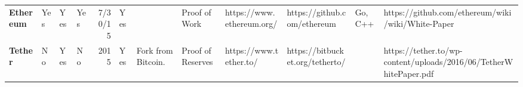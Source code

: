 \begin{table}[htbp]
\begin{adjustbox}{width=25cm, height=6cm, angle=270}
\begin{tabular}{llllrlp{17.915em}rlrrr}
      \rowcolor[rgb]{ .267,  .447,  .769} \textcolor[rgb]{ 1,  1,  1}{\textbf{Ethereum}} & \cellcolor[rgb]{ .776,  .937,  .808}\textcolor[rgb]{ 0,  .38,  0}{Yes} & \cellcolor[rgb]{ .776,  .937,  .808}\textcolor[rgb]{ 0,  .38,  0}{Yes} & \cellcolor[rgb]{ .776,  .937,  .808}\textcolor[rgb]{ 0,  .38,  0}{Yes} & \cellcolor[rgb]{ 1,  1,  1}\textcolor[rgb]{ .188,  .329,  .588}{7/30/15} & \cellcolor[rgb]{ .776,  .937,  .808}\textcolor[rgb]{ 0,  .38,  0}{Yes} & \multicolumn{1}{r}{\cellcolor[rgb]{ 1,  1,  1}\textcolor[rgb]{ .188,  .329,  .588}{}} & \multicolumn{1}{l}{\cellcolor[rgb]{ 1,  1,  1}\textcolor[rgb]{ .188,  .329,  .588}{Proof of Work}} & \cellcolor[rgb]{ 1,  1,  1}\textcolor[rgb]{ .188,  .329,  .588}{https://www.ethereum.org/} & \multicolumn{1}{l}{\cellcolor[rgb]{ 1,  1,  1}\textcolor[rgb]{ .188,  .329,  .588}{https://github.com/ethereum}} & \multicolumn{1}{l}{\cellcolor[rgb]{ 1,  1,  1}\textcolor[rgb]{ .188,  .329,  .588}{Go, C++}} & \multicolumn{1}{l}{\cellcolor[rgb]{ 1,  1,  1}\textcolor[rgb]{ .188,  .329,  .588}{https://github.com/ethereum/wiki/wiki/White-Paper}} \\
      \rowcolor[rgb]{ .267,  .447,  .769} \textcolor[rgb]{ 1,  1,  1}{\textbf{Tether}} & \cellcolor[rgb]{ 1,  .78,  .808}\textcolor[rgb]{ .612,  0,  .024}{No} & \cellcolor[rgb]{ .776,  .937,  .808}\textcolor[rgb]{ 0,  .38,  0}{Yes} & \cellcolor[rgb]{ 1,  .78,  .808}\textcolor[rgb]{ .612,  0,  .024}{No} & \cellcolor[rgb]{ .851,  .882,  .949}\textcolor[rgb]{ .188,  .329,  .588}{2015} & \cellcolor[rgb]{ .776,  .937,  .808}\textcolor[rgb]{ 0,  .38,  0}{Yes} & \cellcolor[rgb]{ .851,  .882,  .949}\textcolor[rgb]{ .188,  .329,  .588}{Fork from Bitcoin.} & \multicolumn{1}{l}{\cellcolor[rgb]{ .851,  .882,  .949}\textcolor[rgb]{ .188,  .329,  .588}{Proof of Reserves}} & \cellcolor[rgb]{ .851,  .882,  .949}\textcolor[rgb]{ .02,  .388,  .757}{https://www.tether.to/} & \multicolumn{1}{l}{\cellcolor[rgb]{ .851,  .882,  .949}\textcolor[rgb]{ .188,  .329,  .588}{https://bitbucket.org/tetherto/}} & \cellcolor[rgb]{ .851,  .882,  .949}\textcolor[rgb]{ .188,  .329,  .588}{} & \multicolumn{1}{l}{\cellcolor[rgb]{ .851,  .882,  .949}\textcolor[rgb]{ .188,  .329,  .588}{https://tether.to/wp-content/uploads/2016/06/TetherWhitePaper.pdf}} \\

\end{tabular}
\end{adjustbox}
\end{table}
